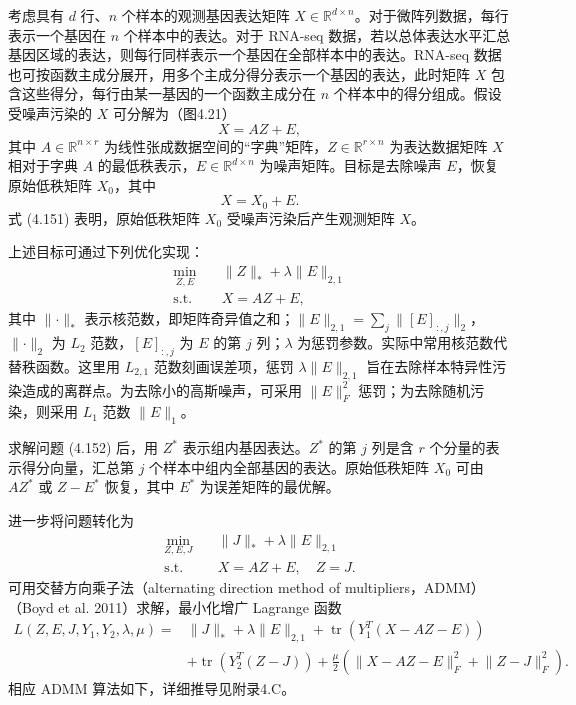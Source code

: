 考虑具有 $d$ 行、$n$ 个样本的观测基因表达矩阵 $X\in\mathbb R^{d\times n}$。对于微阵列数据，每行表示一个基因在 $n$ 个样本中的表达。对于 RNA-seq 数据，若以总体表达水平汇总基因区域的表达，则每行同样表示一个基因在全部样本中的表达。RNA-seq 数据也可按函数主成分展开，用多个主成分得分表示一个基因的表达，此时矩阵 $X$ 包含这些得分，每行由某一基因的一个函数主成分在 $n$ 个样本中的得分组成。假设受噪声污染的 $X$ 可分解为（图4.21）
\begin{equation}
X=AZ+E,
\tag{4.150}
\end{equation}
其中 $A\in\mathbb R^{n\times r}$ 为线性张成数据空间的“字典”矩阵，$Z\in\mathbb R^{r\times n}$ 为表达数据矩阵 $X$ 相对于字典 $A$ 的最低秩表示，$E\in\mathbb R^{d\times n}$ 为噪声矩阵。目标是去除噪声 $E$，恢复原始低秩矩阵 $X_0$，其中
\begin{equation}
X=X_0+E.
\tag{4.151}
\end{equation}
式 (4.151) 表明，原始低秩矩阵 $X_0$ 受噪声污染后产生观测矩阵 $X$。

上述目标可通过下列优化实现：
\begin{equation}
\begin{aligned}
\min_{Z,E}\quad&\lVert Z\rVert_*+\lambda\lVert E\rVert_{2,1}\\
\text{s.t.}\quad&X=AZ+E,
\end{aligned}
\tag{4.152}
\end{equation}
其中 $\lVert\cdot\rVert_*$ 表示核范数，即矩阵奇异值之和；$\lVert E\rVert_{2,1}=\sum_j\lVert[E]_{:,j}\rVert_2$，$\lVert\cdot\rVert_2$ 为 $L_2$ 范数，$[E]_{:,j}$ 为 $E$ 的第 $j$ 列；$\lambda$ 为惩罚参数。实际中常用核范数代替秩函数。这里用 $L_{2,1}$ 范数刻画误差项，惩罚 $\lambda\lVert E\rVert_{2,1}$ 旨在去除样本特异性污染造成的离群点。为去除小的高斯噪声，可采用 $\lVert E\rVert_F^2$ 惩罚；为去除随机污染，则采用 $L_1$ 范数 $\lVert E\rVert_1$。

求解问题 (4.152) 后，用 $Z^*$ 表示组内基因表达。$Z^*$ 的第 $j$ 列是含 $r$ 个分量的表示得分向量，汇总第 $j$ 个样本中组内全部基因的表达。原始低秩矩阵 $X_0$ 可由 $AZ^*$ 或 $Z-E^*$ 恢复，其中 $E^*$ 为误差矩阵的最优解。

进一步将问题转化为
\begin{equation}
\begin{aligned}
\min_{Z,E,J}\quad&\lVert J\rVert_*+\lambda\lVert E\rVert_{2,1}\\
\text{s.t.}\quad&X=AZ+E,\quad Z=J.
\end{aligned}
\tag{4.153}
\end{equation}
可用交替方向乘子法（alternating direction method of multipliers，ADMM）（Boyd et al. 2011）求解，最小化增广 Lagrange 函数
\begin{equation}
\begin{aligned}
L(Z,E,J,Y_1,Y_2,\lambda,\mu)
={}&\lVert J\rVert_*+\lambda\lVert E\rVert_{2,1}
+\operatorname{tr}(Y_1^T(X-AZ-E))\\
&+\operatorname{tr}(Y_2^T(Z-J))
+\frac\mu2(\lVert X-AZ-E\rVert_F^2+\lVert Z-J\rVert_F^2).
\end{aligned}
\tag{4.154}
\end{equation}
相应 ADMM 算法如下，详细推导见附录4.C。

